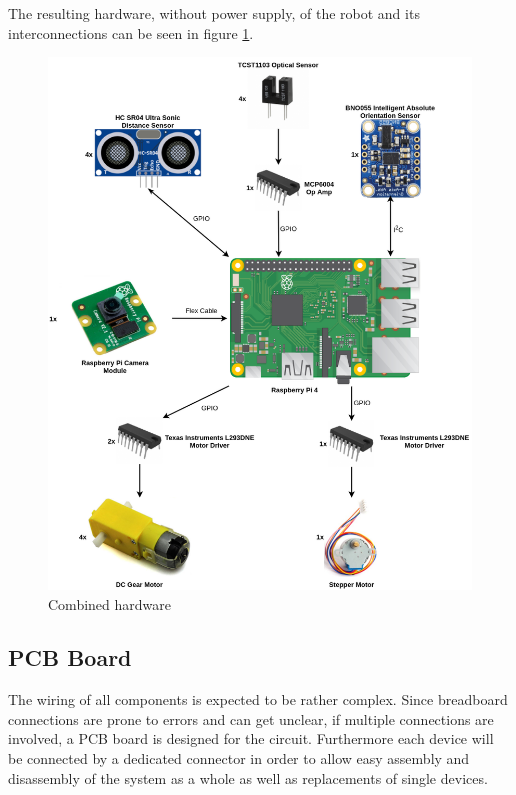 The resulting hardware, without power supply, of the robot and its interconnections can be seen in figure \ref{fig:hardware}.

\begin{figure}[H]
\centering
\includegraphics[scale=0.5]{sources/hardware_setup.png}
\caption[Combined hardware]{Combined hardware}
\label{fig:hardware}
\end{figure}

\subsection{PCB Board}\label{subsec:pcb_board}

The wiring of all components is expected to be rather complex. Since breadboard connections are prone to errors and can get unclear, if multiple connections are involved, a PCB board is designed for the circuit. Furthermore each device will be connected by a dedicated connector in order to allow easy assembly and disassembly of the system as a whole as well as replacements of single devices.

